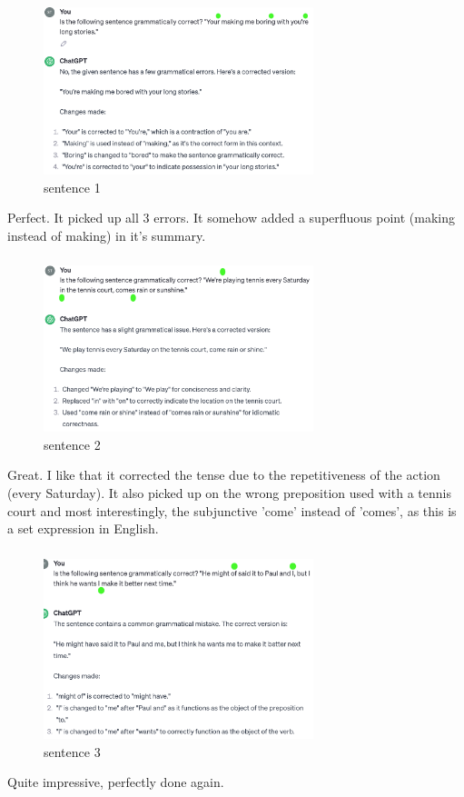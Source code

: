 \documentclass{article}
\begin{document}
\subsubsection{}	%
\begin{figure}[H]
  \centering
  \includegraphics[width=0.7\textwidth]{3sen1.png} 
  \caption{sentence 1}
\end{figure}
Perfect. It picked up all 3 errors. It somehow added a superfluous point (making instead of making) in it's summary. 

\subsubsection{}	%
\begin{figure}[H]
  \centering
  \includegraphics[width=0.7\textwidth]{3sen2.png} 
  \caption{sentence 2}
\end{figure}
Great. I like that it corrected the tense due to the repetitiveness of the action (every Saturday). It also picked up on the wrong preposition used with a tennis court and most interestingly, the subjunctive 'come' instead of 'comes', as this is a set expression in English. 

\subsubsection{}	%
\begin{figure}[H]
  \centering
  \includegraphics[width=0.7\textwidth]{3sen3.png} 
  \caption{sentence 3}
\end{figure}
Quite impressive, perfectly done again. 


\subsection{}
\end{document}
